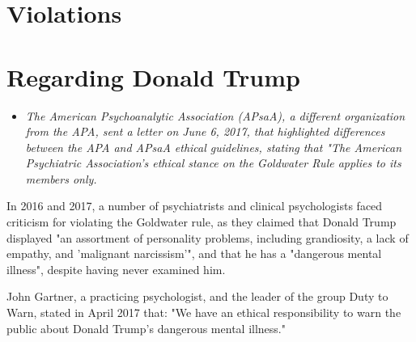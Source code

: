 \section{Violations}\label{violations}

\section{Regarding Donald Trump}\label{regarding-donald-trump}

\begin{itemize}
\item
  \emph{The American Psychoanalytic Association (APsaA), a different
  organization from the APA, sent a letter on June 6, 2017, that
  highlighted differences between the APA and APsaA ethical guidelines,
  stating that "The American Psychiatric Association's ethical stance on
  the Goldwater Rule applies to its members only.}
\end{itemize}

In 2016 and 2017, a number of psychiatrists and clinical psychologists
faced criticism for violating the Goldwater rule, as they claimed that
Donald Trump displayed "an assortment of personality problems, including
grandiosity, a lack of empathy, and 'malignant narcissism'", and that he
has a "dangerous mental illness", despite having never examined him.

John Gartner, a practicing psychologist, and the leader of the group
Duty to Warn, stated in April 2017 that: "We have an ethical
responsibility to warn the public about Donald Trump's dangerous mental
illness."

